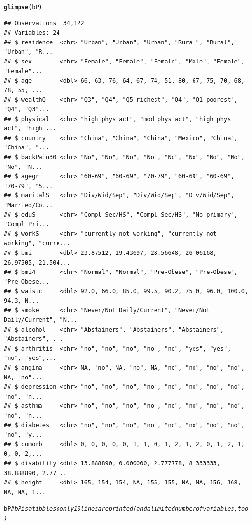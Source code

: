 \documentclass[titlepage]{book}
\makeatletter
\newcommand{\hlcom}[1]{\textcolor[rgb]{0.678,0.584,0.686}{\textit{#1}}}%
\newcommand{\hlstd}[1]{\textcolor[rgb]{0.345,0.345,0.345}{#1}}%
\newcommand{\hlkwd}[1]{\textcolor[rgb]{0.737,0.353,0.396}{\textbf{#1}}}%
\newenvironment{kframe}{%
 \def\at@end@of@kframe{}%
 \ifinner\ifhmode%
  \def\at@end@of@kframe{\end{minipage}}%
  \begin{minipage}{\columnwidth}%
 \fi\fi%
 \def\FrameCommand##1{\hskip\@totalleftmargin \hskip-\fboxsep
 \colorbox{shadecolor}{##1}\hskip-\fboxsep
     \hskip-\linewidth \hskip-\@totalleftmargin \hskip\columnwidth}%
 \MakeFramed {\advance\hsize-\width
   \@totalleftmargin\z@ \linewidth\hsize
   \@setminipage}}%
 {\par\unskip\endMakeFramed%
 \at@end@of@kframe}
\newenvironment{knitrout}{}{} %
\makeatother
\begin{document}
\begin{knitrout}
\begin{kframe}
{\ttfamily\noindent\itshape\color{messagecolor}{\#\# See spec(...) for full column specifications.}}\begin{alltt}
\hlkwd{glimpse}\hlstd{(bP)}
\end{alltt}
\begin{verbatim}
## Observations: 34,122
## Variables: 24
## $ residence  <chr> "Urban", "Urban", "Urban", "Rural", "Rural", "Urban", "R...
## $ sex        <chr> "Female", "Female", "Female", "Male", "Female", "Female"...
## $ age        <dbl> 66, 63, 76, 64, 67, 74, 51, 80, 67, 75, 70, 68, 78, 55, ...
## $ wealthQ    <chr> "Q3", "Q4", "Q5 richest", "Q4", "Q1 poorest", "Q4", "Q3"...
## $ physical   <chr> "high phys act", "mod phys act", "high phys act", "high ...
## $ country    <chr> "China", "China", "China", "Mexico", "China", "China", "...
## $ backPain30 <chr> "No", "No", "No", "No", "No", "No", "No", "No", "No", "N...
## $ agegr      <chr> "60-69", "60-69", "70-79", "60-69", "60-69", "70-79", "5...
## $ maritalS   <chr> "Div/Wid/Sep", "Div/Wid/Sep", "Div/Wid/Sep", "Married/Co...
## $ eduS       <chr> "Compl Sec/HS", "Compl Sec/HS", "No primary", "Compl Pri...
## $ workS      <chr> "currently not working", "currently not working", "curre...
## $ bmi        <dbl> 23.87512, 19.43697, 28.56648, 26.06168, 26.97505, 21.504...
## $ bmi4       <chr> "Normal", "Normal", "Pre-Obese", "Pre-Obese", "Pre-Obese...
## $ waistc     <dbl> 92.0, 66.0, 85.0, 99.5, 90.2, 75.0, 96.0, 100.0, 94.3, N...
## $ smoke      <chr> "Never/Not Daily/Current", "Never/Not Daily/Current", "N...
## $ alcohol    <chr> "Abstainers", "Abstainers", "Abstainers", "Abstainers", ...
## $ arthritis  <chr> "no", "no", "no", "no", "no", "yes", "yes", "no", "yes",...
## $ angina     <chr> NA, "no", NA, "no", NA, "no", "no", "no", "no", NA, "no"...
## $ depression <chr> "no", "no", "no", "no", "no", "no", "no", "no", "no", "n...
## $ asthma     <chr> "no", "no", "no", "no", "no", "no", "no", "no", "no", "n...
## $ diabetes   <chr> "no", "no", "no", "no", "no", "no", "no", "no", "no", "y...
## $ comorb     <dbl> 0, 0, 0, 0, 0, 1, 1, 0, 1, 2, 1, 2, 0, 1, 2, 1, 0, 0, 2,...
## $ disability <dbl> 13.888890, 0.000000, 2.777778, 8.333333, 38.888890, 2.77...
## $ height     <dbl> 165, 154, 154, NA, 155, 155, NA, NA, 156, 168, NA, NA, 1...
\end{verbatim}
\begin{alltt}
\hlstd{bP}             \hlcom{# bP is a tibble so only 10 lines are printed (and a limited number of variables, too)}
\end{alltt}
\begin{verbatim}

\end{verbatim}
\end{kframe}
\end{knitrout}
\end{document}

